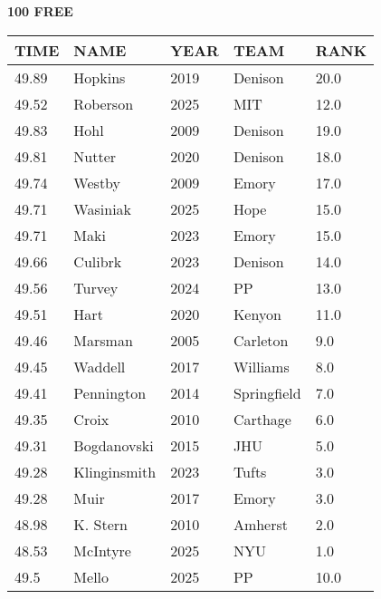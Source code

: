 \begin{minipage}[t]{0.48\textwidth}
\centering
\textbf{100 FREE}\\[0.05cm]
\begin{tabular}{@{}p{1.8cm}p{2.8cm}p{1.2cm}p{1.4cm}p{0.8cm}@{}}
\hline
\textbf{TIME} & \textbf{NAME} & \textbf{YEAR} & \textbf{TEAM} & \textbf{RANK} \\
\hline
49.89 & Hopkins & 2019 & Denison & 20.0 \\
49.52 & Roberson & 2025 & MIT & 12.0 \\
49.83 & Hohl & 2009 & Denison & 19.0 \\
49.81 & Nutter & 2020 & Denison & 18.0 \\
49.74 & Westby & 2009 & Emory & 17.0 \\
49.71 & Wasiniak & 2025 & Hope & 15.0 \\
49.71 & Maki & 2023 & Emory & 15.0 \\
49.66 & Culibrk & 2023 & Denison & 14.0 \\
49.56 & Turvey & 2024 & PP & 13.0 \\
49.51 & Hart & 2020 & Kenyon & 11.0 \\
49.46 & Marsman & 2005 & Carleton & 9.0 \\
49.45 & Waddell & 2017 & Williams & 8.0 \\
49.41 & Pennington & 2014 & Springfield & 7.0 \\
49.35 & Croix & 2010 & Carthage & 6.0 \\
49.31 & Bogdanovski & 2015 & JHU & 5.0 \\
49.28 & Klinginsmith & 2023 & Tufts & 3.0 \\
49.28 & Muir & 2017 & Emory & 3.0 \\
48.98 & K. Stern & 2010 & Amherst & 2.0 \\
48.53 & McIntyre & 2025 & NYU & 1.0 \\
49.5 & Mello & 2025 & PP & 10.0 \\
\hline
\end{tabular}
\end{minipage}

\vspace{0.4cm}

